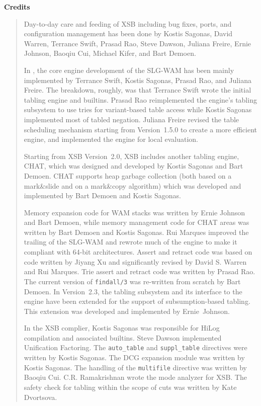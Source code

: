 \begin{center}
{\bf {\Large 
		Credits
}}
\end{center}


\begin{quote}
Day-to-day care and feeding of XSB including bug fixes, ports, and
configuration management has been done by Kostis Sagonas, David
Warren, Terrance Swift, Prasad Rao, Steve Dawson, Juliana Freire,
Ernie Johnson, Baoqiu Cui, Michael Kifer, and Bart Demoen.

In \version, the core engine development of the SLG-WAM has been
mainly implemented by Terrance Swift, Kostis Sagonas, Prasad Rao, and
Juliana Freire.  The breakdown, roughly, was that Terrance Swift wrote
the initial tabling engine and builtins.  Prasad Rao reimplemented the
engine's tabling subsystem to use tries for variant-based table access
while Kostis Sagonas implemented most of tabled negation.  Juliana
Freire revised the table scheduling mechanism starting from
Version~1.5.0 to create a more efficient engine, and implemented the
engine for local evaluation.

Starting from XSB Version~2.0, XSB includes another tabling engine,
CHAT, which was designed and developed by Kostis Sagonas and Bart
Demoen.  CHAT supports heap garbage collection (both based on a
mark\&slide and on a mark\&copy algorithm) which was developed and
implemented by Bart Demoen and Kostis Sagonas.

Memory expansion code for WAM stacks was written by Ernie Johnson and
Bart Demoen, while memory management code for CHAT areas was written
by Bart Demoen and Kostis Sagonas.  Rui Marques improved the trailing
of the SLG-WAM and rewrote much of the engine to make it compliant
with 64-bit architectures.  Assert and retract code was based on code
written by Jiyang Xu and significantly revised by David S. Warren and
Rui Marques.  Trie assert and retract code was written by Prasad Rao.
The current version of {\tt findall/3} was re-written from scratch by
Bart Demoen.  In Version~2.3, the tabling subsystem and its interface
to the engine have been extended for the support of subsumption-based
tabling.  This extension was developed and implemented by
Ernie~Johnson.

In the XSB complier, Kostis Sagonas was responsible for HiLog
compilation and associated builtins.  Steve Dawson implemented
Unification Factoring.  The {\tt auto\_table} and {\tt suppl\_table}
directives were written by Kostis Sagonas.  The DCG expansion module
was written by Kostis Sagonas.  The handling of the {\tt multifile}
directive was written by Baoqiu Cui.  C.R. Ramakrishnan wrote the mode
analyzer for XSB.  The safety check for tabling within the scope of
cuts was written by Kate Dvortsova.


\end{quote}
